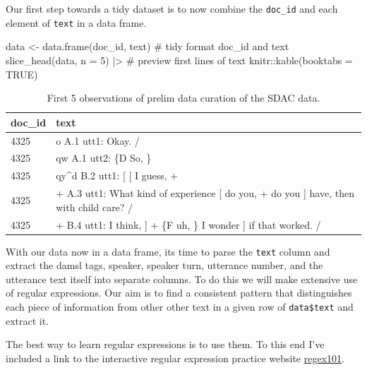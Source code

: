 \documentclass[
  letterpaper,
]{latex/krantz}
\newenvironment{Shaded}{\begin{snugshade}}{\end{snugshade}}
\newcommand{\AttributeTok}[1]{\textcolor[rgb]{0.40,0.45,0.13}{#1}}
\newcommand{\CommentTok}[1]{\textcolor[rgb]{0.37,0.37,0.37}{#1}}
\newcommand{\ConstantTok}[1]{\textcolor[rgb]{0.56,0.35,0.01}{#1}}
\newcommand{\DecValTok}[1]{\textcolor[rgb]{0.68,0.00,0.00}{#1}}
\newcommand{\FunctionTok}[1]{\textcolor[rgb]{0.28,0.35,0.67}{#1}}
\newcommand{\NormalTok}[1]{\textcolor[rgb]{0.00,0.23,0.31}{#1}}
\newcommand{\OtherTok}[1]{\textcolor[rgb]{0.00,0.23,0.31}{#1}}
\newcommand{\SpecialCharTok}[1]{\textcolor[rgb]{0.37,0.37,0.37}{#1}}
\begin{document}
Our first step towards a tidy dataset is to now combine the
\texttt{doc\_id} and each element of \texttt{text} in a data frame.

\begin{Shaded}
\begin{Highlighting}[]
\NormalTok{data }\OtherTok{\textless{}{-}} \FunctionTok{data.frame}\NormalTok{(doc\_id, text) }\CommentTok{\# tidy format \textasciigrave{}doc\_id\textasciigrave{} and \textasciigrave{}text\textasciigrave{}}
\FunctionTok{slice\_head}\NormalTok{(data, }\AttributeTok{n =} \DecValTok{5}\NormalTok{) }\SpecialCharTok{|\textgreater{}} \CommentTok{\# preview first lines of \textasciigrave{}text\textasciigrave{}}
\NormalTok{  knitr}\SpecialCharTok{::}\FunctionTok{kable}\NormalTok{(}\AttributeTok{booktabs =} \ConstantTok{TRUE}\NormalTok{)}
\end{Highlighting}
\end{Shaded}

\hypertarget{tbl-cd-semi-sdac-text-8}{}
\begin{table}
\caption{\label{tbl-cd-semi-sdac-text-8}First 5 observations of prelim data curation of the SDAC data. }\tabularnewline

\centering
\begin{tabular}{ll}
\toprule
doc\_id & text\\
\midrule
4325 & o          A.1 utt1: Okay.  /\\
4325 & qw          A.1 utt2: \{D So, \}\\
4325 & qy\textasciicircum{}d          B.2 utt1: [ [ I guess, +\\
4325 & +          A.3 utt1: What kind of experience [ do you, + do you ] have, then with child care? /\\
4325 & +          B.4 utt1: I think, ] + \{F uh, \} I wonder ] if that worked. /\\
\bottomrule
\end{tabular}
\end{table}

With our data now in a data frame, its time to parse the \texttt{text}
column and extract the damsl tags, speaker, speaker turn, utterance
number, and the utterance text itself into separate columns. To do this
we will make extensive use of regular expressions. Our aim is to find a
consistent pattern that distinguishes each piece of information from
other other text in a given row of \texttt{data\$text} and extract it.

The best way to learn regular expressions is to use them. To this end
I've included a link to the interactive regular expression practice
website \href{https://regex101.com}{regex101}.
\end{document}
